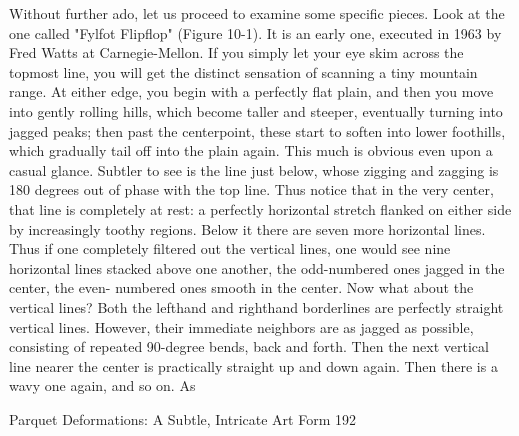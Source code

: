         Without further ado, let us proceed to examine some specific pieces. Look at the
one called "Fylfot Flipflop" (Figure 10-1). It is an early one, executed in 1963 by Fred
Watts at Carnegie-Mellon. If you simply let your eye skim across the topmost line, you
will get the distinct sensation of scanning a tiny mountain range. At either edge, you
begin with a perfectly flat plain, and then you move into gently rolling hills, which
become taller and steeper, eventually turning into jagged peaks; then past the centerpoint,
these start to soften into lower foothills, which gradually tail off into the plain again. This
much is obvious even upon a casual glance. Subtler to see is the line just below, whose
zigging and zagging is 180 degrees out of phase with the top line. Thus notice that in the
very center, that line is completely at rest: a perfectly horizontal stretch flanked on either
side by increasingly toothy regions. Below it there are seven more horizontal lines. Thus
if one completely filtered out the vertical lines, one would see nine horizontal lines
stacked above one another, the odd-numbered ones jagged in the center, the even-
numbered ones smooth in the center.
        Now what about the vertical lines? Both the lefthand and righthand borderlines
are perfectly straight vertical lines. However, their immediate neighbors are as jagged as
possible, consisting of repeated 90-degree bends, back and forth. Then the next vertical
line nearer the center is practically straight up and down again. Then there is a wavy one
again, and so on. As




Parquet Deformations: A Subtle, Intricate Art Form                                         192

